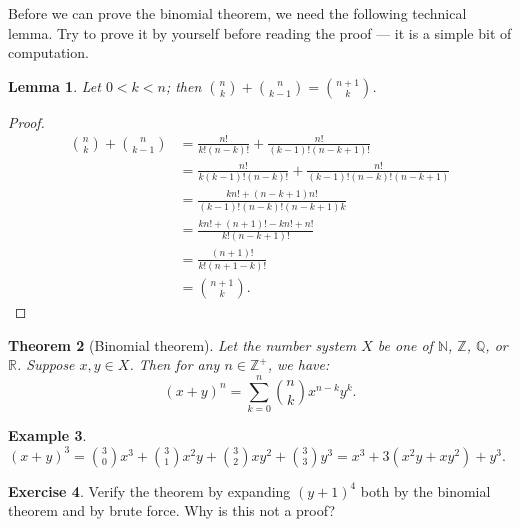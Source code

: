\documentclass[a4paper]{amsart}
\newtheorem{thm}{Theorem}[section]
\newtheorem{lem}[thm]{Lemma}
\theoremstyle{definition}
\newtheorem{ex}[thm]{Example}
\newtheorem{exercise}[thm]{Exercise}
\theoremstyle{remark}
\begin{document}
Before we can prove the binomial theorem, we need the following technical lemma. Try to prove it
by yourself before reading the proof --- it is a simple bit of computation.
\begin{lem}
  Let $ 0 < k < n $; then $ \binom{n}{k} + \binom{n}{k - 1} = \binom{n + 1}{k} $.
\end{lem}
\begin{proof}
  \begin{align*}
    \binom{n}{k} + \binom{n}{k - 1} &= \frac{n!}{k! (n - k)!} + \frac{n!}{(k - 1)! (n - k + 1)!}\\
                                    &= \frac{n!}{k(k - 1)! (n - k)!} + \frac{n!}{(k - 1)! (n - k)! (n - k + 1)}\\
                                    &= \frac{kn! + (n - k + 1) n!}{(k - 1)! (n - k)! (n - k + 1)k}\\
                                    &= \frac{kn! + (n + 1)! - kn! + n!}{k!(n - k + 1)!}\\
                                    &= \frac{(n + 1)!}{k!(n + 1 - k)!}\\
                                    &= \binom{n + 1}{k}.
  \end{align*}
\end{proof}

\begin{thm}[Binomial theorem]
  Let the number system $ X $ be one of $ \mathbb{N} $, $ \mathbb{Z} $, $ \mathbb{Q} $, or $ \mathbb{R} $. Suppose $ x, y \in X $. Then
  for any $ n \in \mathbb{Z}^+ $, we have:
  \begin{displaymath}
    (x + y)^n = \sum_{k = 0}^n \binom{n}{k} x^{n - k} y^k.
  \end{displaymath}
\end{thm}

\begin{ex}
  $ (x + y)^3 = \binom{3}{0} x^3 + \binom{3}{1} x^2 y + \binom{3}{2} x y^2 + \binom{3}{3} y^3 = x^3 + 3(x^2 y + xy^2) + y^3 $.
\end{ex}

\begin{exercise}
  Verify the theorem by expanding $ (y + 1)^4 $ both by the binomial theorem and by brute force. Why is this not a proof?
\end{exercise}
\end{document}
